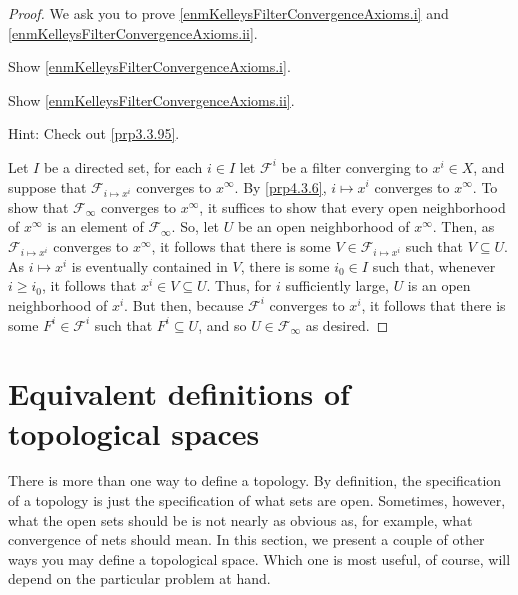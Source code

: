 \begin{prp}
\begin{rmk}
\end{rmk}
\begin{proof}
We ask you to prove \ref{enmKelleysFilterConvergenceAxioms.i} and \ref{enmKelleysFilterConvergenceAxioms.ii}.
\begin{exr}
Show \ref{enmKelleysFilterConvergenceAxioms.i}.
\end{exr}
\begin{exr}
Show \ref{enmKelleysFilterConvergenceAxioms.ii}.
\begin{rmk}
Hint:  Check out \cref{prp3.3.95}.
\end{rmk}
\end{exr}
Let $I$ be a directed set, for each $i\in I$ let $\mathcal{F}^i$ be a filter converging to $x^i\in X$, and suppose that $\mathcal{F}_{i\mapsto x^i}$ converges to $x^\infty$.  By \cref{prp4.3.6}, $i\mapsto x^i$ converges to $x^\infty$.  To show that $\mathcal{F}_\infty$ converges to $x^\infty$, it suffices to show that every open neighborhood of $x^\infty$ is an element of $\mathcal{F}_\infty$.  So, let $U$ be an open neighborhood of $x^\infty$.  Then, as $\mathcal{F}_{i\mapsto x^i}$ converges to $x^\infty$, it follows that there is some $V\in \mathcal{F}_{i\mapsto x^i}$ such that $V\subseteq U$.  As $i\mapsto x^i$ is eventually contained in $V$, there is some $i_0\in I$ such that, whenever $i\geq i_0$, it follows that $x^i\in V\subseteq U$.  Thus, for $i$ sufficiently large, $U$ is an open neighborhood of $x^i$.  But then, because $\mathcal{F}^i$ converges to $x^i$, it follows that there is some $F^i\in \mathcal{F}^i$ such that $F^i\subseteq U$, and so $U\in \mathcal{F}_{\infty}$ as desired.
\end{proof}
\end{prp}

\section{Equivalent definitions of topological spaces}

There is more than one way to define a topology.  By definition, the specification of a topology is just the specification of what sets are open.  Sometimes, however, what the open sets should be is not nearly as obvious as, for example, what convergence of nets should mean.  In this section, we present a couple of other ways you may define a topological space.  Which one is most useful, of course, will depend on the particular problem at hand.

